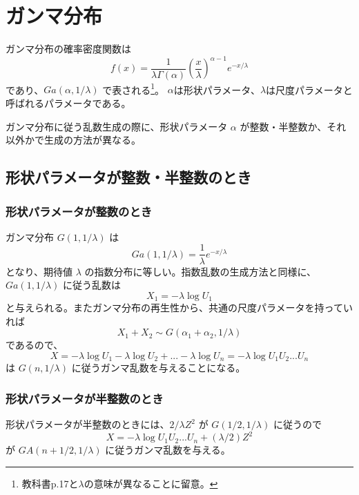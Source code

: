 \documentclass[10pt, a4paper]{ltjsarticle}
\begin{document}
\section{ガンマ分布}

ガンマ分布の確率密度関数は
\begin{equation}
  f(x) = \frac{1}{\lambda \Gamma(\alpha)} \left(\frac{x}{\lambda}\right)^{\alpha-1} e^{-x/\lambda}
\end{equation}
であり、$Ga(\alpha,1/\lambda)$ で表される\footnote{教科書p.17と$\lambda$の意味が異なることに留意。}。
$\alpha$は形状パラメータ、$\lambda$は尺度パラメータと呼ばれるパラメータである。

ガンマ分布に従う乱数生成の際に、形状パラメータ $\alpha$ が整数・半整数か、それ以外かで生成の方法が異なる。

\subsection{形状パラメータが整数・半整数のとき}
\subsubsection{形状パラメータが整数のとき}
ガンマ分布 $G(1,1/\lambda)$ は
\begin{equation}
  Ga(1,1/\lambda) = \frac{1}{\lambda} e^{-x/\lambda}
\end{equation}
となり、期待値 $\lambda$ の指数分布に等しい。指数乱数の生成方法と同様に、$Ga(1,1/\lambda)$ に従う乱数は
\begin{equation}
  X_1 = -\lambda \log U_1
\end{equation}
と与えられる。またガンマ分布の再生性から、共通の尺度パラメータを持っていれば
\begin{equation}
 X_1 + X_2 \sim G(\alpha_1+\alpha_2,1/\lambda) 
\end{equation}
であるので、
\begin{equation}
  X = -\lambda\log U_1  -\lambda\log U_2 + ... -\lambda\log U_n = -\lambda \log U_1U_2...U_n
\end{equation}
は $G(n,1/\lambda)$ に従うガンマ乱数を与えることになる。

\subsubsection{形状パラメータが半整数のとき}
形状パラメータが半整数のときには、$2/\lambda Z^2$ が $G(1/2,1/\lambda)$ に従うので
\begin{equation}
  X = -\lambda \log U_1U_2...U_n + (\lambda/2) Z^2
\end{equation}
が $GA(n+1/2,1/\lambda)$ に従うガンマ乱数を与える。
\end{document}
